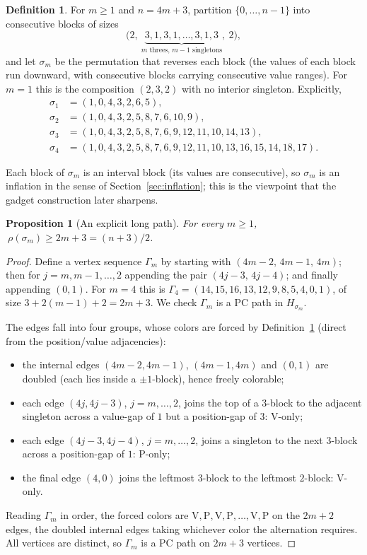 \documentclass[11pt]{article}
\newtheorem{proposition}[theorem]{Proposition}
\theoremstyle{definition}
\newtheorem{definition}[theorem]{Definition}
\begin{document}
\begin{definition}\label{def:sigmam}
For $m\ge1$ and $n=4m+3$, partition $\{0,\dots,n-1\}$ into consecutive blocks of sizes
\[
  \bigl(2,\ \underbrace{3,1,3,1,\dots,3,1,3}_{m\text{ threes, }m-1\text{ singletons}},\
  2\bigr),
\]
and let $\sigma_m$ be the permutation that reverses each block (the values of each
block run downward, with consecutive blocks carrying consecutive value ranges). For
$m=1$ this is the composition $(2,3,2)$ with no interior singleton. Explicitly,
\[
\begin{aligned}
\sigma_1 &= (1,0,4,3,2,6,5),\\
\sigma_2 &= (1,0,4,3,2,5,8,7,6,10,9),\\
\sigma_3 &= (1,0,4,3,2,5,8,7,6,9,12,11,10,14,13),\\
\sigma_4 &= (1,0,4,3,2,5,8,7,6,9,12,11,10,13,16,15,14,18,17).
\end{aligned}
\]
\end{definition}

Each block of $\sigma_m$ is an interval block (its values are consecutive), so
$\sigma_m$ is an inflation in the sense of Section~\ref{sec:inflation}; this is the
viewpoint that the gadget construction later sharpens.

\begin{proposition}[An explicit long path]\label{prop:sigmam-lower}
For every $m\ge1$, $\ \rho(\sigma_m)\ge2m+3=(n+3)/2$.
\end{proposition}

\begin{proof}
Define a vertex sequence $\Gamma_m$ by starting with $(4m-2,\,4m-1,\,4m)$; then for
$j=m,m-1,\dots,2$ appending the pair $(4j-3,\,4j-4)$; and finally appending $(0,1)$.
For $m=4$ this is $\Gamma_4=(14,15,16,13,12,9,8,5,4,0,1)$, of size
$3+2(m-1)+2=2m+3$. We check $\Gamma_m$ is a PC path in $H_{\sigma_m}$.

The edges fall into four groups, whose colors are forced by Definition~\ref{def:sigmam}
(direct from the position/value adjacencies):
\begin{itemize}
\item the internal edges $(4m-2,4m-1)$, $(4m-1,4m)$ and $(0,1)$ are doubled (each lies
inside a $\pm1$-block), hence freely colorable;
\item each edge $(4j,4j-3)$, $j=m,\dots,2$, joins the top of a $3$-block to the
adjacent singleton across a value-gap of $1$ but a position-gap of $3$: V-only;
\item each edge $(4j-3,4j-4)$, $j=m,\dots,2$, joins a singleton to the next $3$-block
across a position-gap of $1$: P-only;
\item the final edge $(4,0)$ joins the leftmost $3$-block to the leftmost $2$-block:
V-only.
\end{itemize}
Reading $\Gamma_m$ in order, the forced colors are
$\mathrm{V},\mathrm{P},\mathrm{V},\mathrm{P},\dots,\mathrm{V},\mathrm{P}$ on the
$2m+2$ edges, the doubled internal edges taking whichever color the alternation
requires. All vertices are distinct, so $\Gamma_m$ is a PC path on $2m+3$ vertices.
\end{proof}
\end{document}
